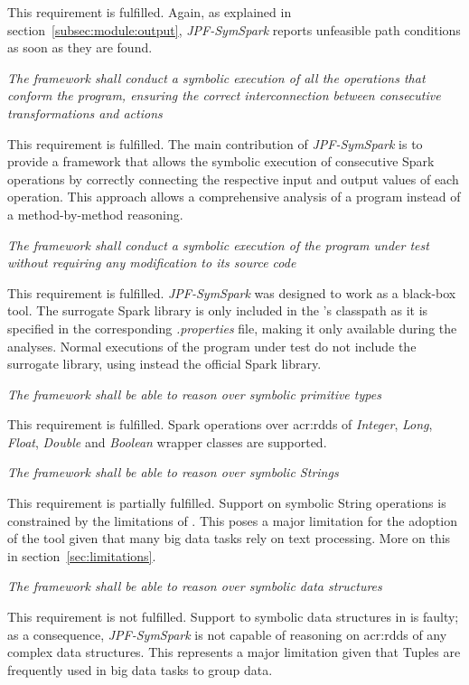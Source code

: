 \begin{itemize}
This requirement is fulfilled. Again, as explained in section~\ref{subsec:module:output}, \textit{JPF-SymSpark} reports unfeasible path conditions as soon as they are found.

 \textit{The framework shall conduct a symbolic execution of all the operations that conform the program, ensuring the correct interconnection between consecutive transformations and actions}

This requirement is fulfilled. The main contribution of \textit{JPF-SymSpark} is to provide a framework that allows the symbolic execution of consecutive Spark operations by correctly connecting the respective input and output values of each operation. This approach allows a comprehensive analysis of a program instead of a method-by-method reasoning.

 \textit{The framework shall conduct a symbolic execution of the program under test without requiring any modification to its source code}

This requirement is fulfilled. \textit{JPF-SymSpark} was designed to work as a black-box tool. The surrogate Spark library is only included in the \jpf{}'s classpath as it is specified in the corresponding \textit{.properties} file, making it only available during the analyses. Normal executions of the program under test do not include the surrogate library, using instead the official Spark library.

 \textit{The framework shall be able to reason over symbolic primitive types}

This requirement is fulfilled. Spark operations over \acrshort{acr:rdd}s of \textit{Integer}, \textit{Long}, \textit{Float}, \textit{Double} and \textit{Boolean} wrapper classes are supported.

 \textit{The framework shall be able to reason over symbolic Strings}

This requirement is partially fulfilled. Support on symbolic String operations is constrained by the limitations of \spf{}. This poses a major limitation for the adoption of the tool given that many big data tasks rely on text processing. More on this in section~\ref{sec:limitations}.

 \textit{The framework shall be able to reason over symbolic data structures}

This requirement is not fulfilled. Support to symbolic data structures in \spf{} is faulty; as a consequence, \textit{JPF-SymSpark} is not capable of reasoning on \acrshort{acr:rdd}s of any complex data structures. This represents a major limitation given that Tuples are frequently used in big data tasks to group data.


\end{itemize}

